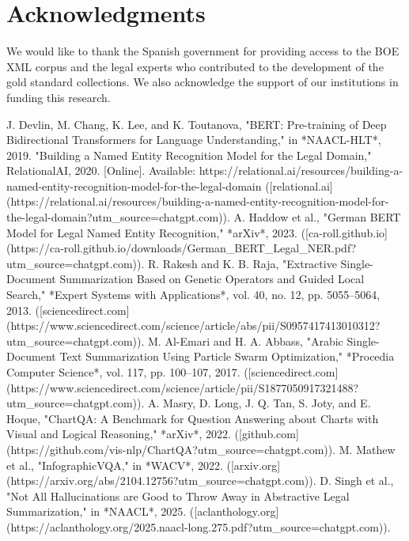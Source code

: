 \documentclass[conference]{IEEEtran}
\begin{document}
\section*{Acknowledgments}
We would like to thank the Spanish government for providing access to the BOE XML corpus and the legal experts who contributed to the development of the gold standard collections. We also acknowledge the support of our institutions in funding this research.

\begin{thebibliography}{99}
 J. Devlin, M. Chang, K. Lee, and K. Toutanova, "BERT: Pre-training of Deep Bidirectional Transformers for Language Understanding," in *NAACL-HLT*, 2019.
 "Building a Named Entity Recognition Model for the Legal Domain," RelationalAI, 2020. [Online]. Available: https://relational.ai/resources/building-a-named-entity-recognition-model-for-the-legal-domain ([relational.ai](https://relational.ai/resources/building-a-named-entity-recognition-model-for-the-legal-domain?utm_source=chatgpt.com)).
 A. Haddow et al., "German BERT Model for Legal Named Entity Recognition," *arXiv*, 2023. ([ca-roll.github.io](https://ca-roll.github.io/downloads/German_BERT_Legal_NER.pdf?utm_source=chatgpt.com)).
 R. Rakesh and K. B. Raja, "Extractive Single-Document Summarization Based on Genetic Operators and Guided Local Search," *Expert Systems with Applications*, vol. 40, no. 12, pp. 5055–5064, 2013. ([sciencedirect.com](https://www.sciencedirect.com/science/article/abs/pii/S0957417413010312?utm_source=chatgpt.com)).
 M. Al-Emari and H. A. Abbass, "Arabic Single-Document Text Summarization Using Particle Swarm Optimization," *Procedia Computer Science*, vol. 117, pp. 100–107, 2017. ([sciencedirect.com](https://www.sciencedirect.com/science/article/pii/S1877050917321488?utm_source=chatgpt.com)).
 A. Masry, D. Long, J. Q. Tan, S. Joty, and E. Hoque, "ChartQA: A Benchmark for Question Answering about Charts with Visual and Logical Reasoning," *arXiv*, 2022. ([github.com](https://github.com/vis-nlp/ChartQA?utm_source=chatgpt.com)).
 M. Mathew et al., "InfographicVQA," in *WACV*, 2022. ([arxiv.org](https://arxiv.org/abs/2104.12756?utm_source=chatgpt.com)).
 D. Singh et al., "Not All Hallucinations are Good to Throw Away in Abstractive Legal Summarization," in *NAACL*, 2025. ([aclanthology.org](https://aclanthology.org/2025.naacl-long.275.pdf?utm_source=chatgpt.com)).

\end{thebibliography}
\end{document}
